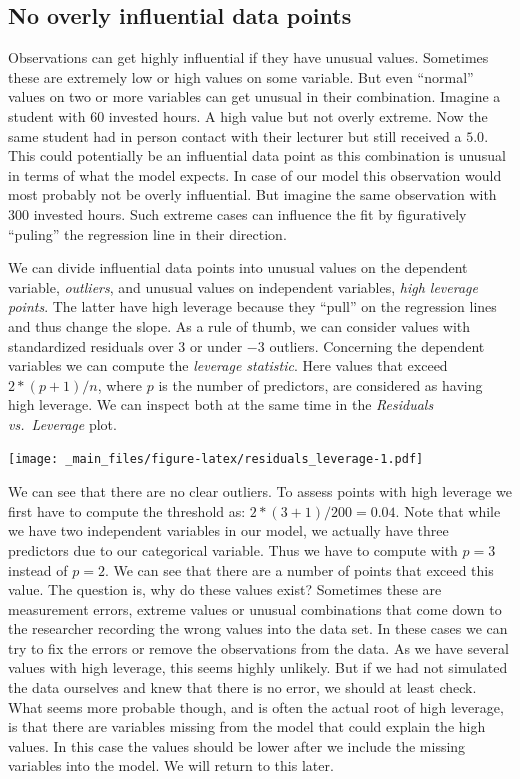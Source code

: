 \documentclass[
]{book}
\begin{document}
\hypertarget{no-overly-influential-data-points}{%
\subsection{No overly influential data points}\label{no-overly-influential-data-points}}

Observations can get highly influential if they have unusual values. Sometimes
these are extremely low or high values on some variable. But even ``normal'' values
on two or more variables can get unusual in their combination. Imagine a student
with \(60\) invested hours. A high value but not overly extreme. Now the same student
had in person contact with their lecturer but still received a \(5.0\). This could
potentially be an influential data point as this combination is unusual in terms of what the
model expects. In case of our model this observation would most probably not be
overly influential. But imagine the same observation with \(300\) invested hours.
Such extreme cases can influence the fit by figuratively ``puling'' the regression
line in their direction.

We can divide influential data points into unusual values on the dependent
variable, \emph{outliers}, and unusual values on independent variables,
\emph{high leverage points}. The latter have high leverage because they ``pull'' on the
regression lines and thus change the slope. As a rule of thumb, we can consider
values with standardized residuals over \(3\) or under \(-3\) outliers.
Concerning the dependent variables we can compute the \emph{leverage statistic}.
Here values that exceed \(2 * (p + 1) / n\), where \(p\) is the number of
predictors, are considered as having high leverage.
We can inspect both at the same time in the \emph{Residuals vs.~Leverage} plot.

\texttt{[image: \_main\_files/figure-latex/residuals\_leverage-1.pdf]}

We can see that there are no clear outliers. To assess points with high leverage
we first have to compute the threshold as: \(2 * (3 + 1) / 200 = 0.04\). Note that
while we have two independent variables in our model, we actually have three
predictors due to our categorical variable. Thus we have to compute with \(p = 3\)
instead of \(p = 2\).
We can
see that there are a number of points that exceed this value. The question is,
why do these values exist? Sometimes these are measurement errors, extreme values
or unusual combinations that come down to the researcher recording the wrong
values into the data set. In these cases we can try to fix the errors or remove
the observations from the data. As we have several values with high leverage,
this seems highly unlikely. But if we had not simulated the data ourselves and
knew that there is no error, we should at least check. What seems more probable
though, and is often the actual root of high leverage, is that there are
variables missing from the model that could explain the high values.
In this case the values should be lower after we include the missing
variables into the model. We will return to this later.
\end{document}
